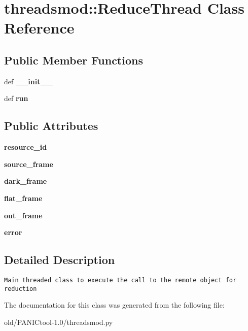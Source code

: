 \section{threadsmod::Reduce\-Thread Class Reference}
\label{classthreadsmod_1_1ReduceThread}
\subsection*{Public Member Functions}
\begin{CompactItemize}
\item 
def \textbf{\_\-\_\-init\_\-\_\-}\label{classthreadsmod_1_1ReduceThread_3f1210398234e92e17e85a59f2bffae0}

\item 
def \textbf{run}\label{classthreadsmod_1_1ReduceThread_b5f3feb0864f77d6ed29e69ff324e23b}

\end{CompactItemize}
\subsection*{Public Attributes}
\begin{CompactItemize}
\item 
\textbf{resource\_\-id}\label{classthreadsmod_1_1ReduceThread_236515af370addb42b36386679d3f32d}

\item 
\textbf{source\_\-frame}\label{classthreadsmod_1_1ReduceThread_8cbe49561532d8534f9d7505016efdbc}

\item 
\textbf{dark\_\-frame}\label{classthreadsmod_1_1ReduceThread_615ad188ac50a7211637b52a088b6dce}

\item 
\textbf{flat\_\-frame}\label{classthreadsmod_1_1ReduceThread_8b54a3c09b510f18c7540ef1bb798669}

\item 
\textbf{out\_\-frame}\label{classthreadsmod_1_1ReduceThread_bf15a3194664dac4ce514ef0dac6ceab}

\item 
\textbf{error}\label{classthreadsmod_1_1ReduceThread_8e722219d8fe79b9a7c375f20481f7a9}

\end{CompactItemize}


\subsection{Detailed Description}


\footnotesize\begin{verbatim}
Main threaded class to execute the call to the remote object for reduction  
\end{verbatim}
\normalsize
 



The documentation for this class was generated from the following file:\begin{CompactItemize}
\item 
old/PANICtool-1.0/threadsmod.py\end{CompactItemize}
